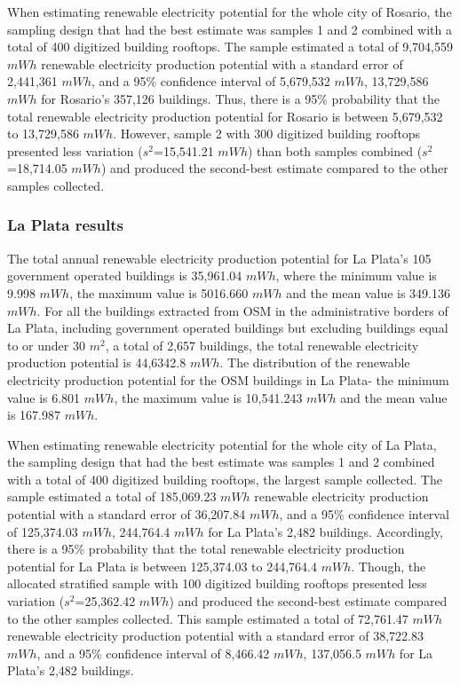 \documentclass[
]{book}
\begin{document}
When estimating renewable electricity potential for the whole city of Rosario, the sampling design that had the best estimate was samples 1 and 2 combined with a total of 400 digitized building rooftops. The sample estimated a total of 9,704,559 \(mWh\) renewable electricity production potential with a standard error of 2,441,361 \(mWh\), and a 95\% confidence interval of 5,679,532 \(mWh\), 13,729,586 \(mWh\) for Rosario's 357,126 buildings. Thus, there is a 95\% probability that the total renewable electricity production potential for Rosario is between 5,679,532 to 13,729,586 \(mWh\). However, sample 2 with 300 digitized building rooftops presented less variation (\(s^2\)=15,541.21 \(mWh\)) than both samples combined (\(s^2\)=18,714.05 \(mWh\)) and produced the second-best estimate compared to the other samples collected.

\hypertarget{la-plata-results}{%
\subsubsection*{La Plata results}\label{la-plata-results}}

The total annual renewable electricity production potential for La Plata's 105 government operated buildings is 35,961.04 \(mWh\), where the minimum value is 9.998 \(mWh\), the maximum value is 5016.660 \(mWh\) and the mean value is 349.136 \(mWh\).
For all the buildings extracted from OSM in the administrative borders of La Plata, including government operated buildings but excluding buildings equal to or under 30 \(m^2\), a total of 2,657 buildings, the total renewable electricity production potential is 44,6342.8 \(mWh\). The distribution of the renewable electricity production potential for the OSM buildings in La Plata- the minimum value is 6.801 \(mWh\), the maximum value is 10,541.243 \(mWh\) and the mean value is 167.987 \(mWh\).

When estimating renewable electricity potential for the whole city of La Plata, the sampling design that had the best estimate was samples 1 and 2 combined with a total of 400 digitized building rooftops, the largest sample collected. The sample estimated a total of 185,069.23 \(mWh\) renewable electricity production potential with a standard error of 36,207.84 \(mWh\), and a 95\% confidence interval of 125,374.03 \(mWh\), 244,764.4 \(mWh\) for La Plata's 2,482 buildings. Accordingly, there is a 95\% probability that the total renewable electricity production potential for La Plata is between 125,374.03 to 244,764.4 \(mWh\). Though, the allocated stratified sample with 100 digitized building rooftops presented less variation (\(s^2\)=25,362.42 \(mWh\)) and produced the second-best estimate compared to the other samples collected. This sample estimated a total of 72,761.47 \(mWh\) renewable electricity production potential with a standard error of 38,722.83 \(mWh\), and a 95\% confidence interval of 8,466.42 \(mWh\), 137,056.5 \(mWh\) for La Plata's 2,482 buildings.
\end{document}
